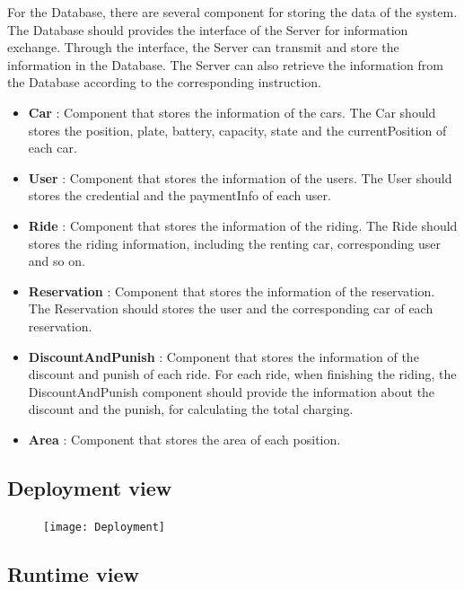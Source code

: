 \documentclass{article}
\begin{document}
	For the Database, there are several component for storing the data of the system. The Database should provides the interface of the Server for information exchange. Through the interface, the Server can transmit and  store the information in the Database. The Server can also retrieve the information from the Database according to the corresponding instruction.

	\begin{itemize}
		\item \textbf{Car} : Component that stores the information of the cars. The Car should stores the position, plate, battery, capacity, 	state and the currentPosition of each car.
		\item \textbf{User} : Component that stores the information of the users. The User should stores the credential and the paymentInfo of each user.
		\item \textbf{Ride} : Component that stores the information of the riding. The Ride should stores the riding information, including the renting car, corresponding user and so on.
		\item \textbf{Reservation} : Component that stores the information of the reservation. The Reservation should stores the user and the corresponding car of each reservation.
		\item \textbf{DiscountAndPunish} : Component that stores the information of the discount and punish of each ride. For each ride, when finishing the riding, the DiscountAndPunish component should provide the information about the discount and the punish, for calculating the total charging.
		\item \textbf{Area} : Component that stores the area of each position.
	\end{itemize}
	\newpage

	\subsection{Deployment view}
	\begin{figure}[h]
		\texttt{[image: Deployment]}
	\end{figure}
	\newpage
	\subsection{Runtime view}
\end{document}
